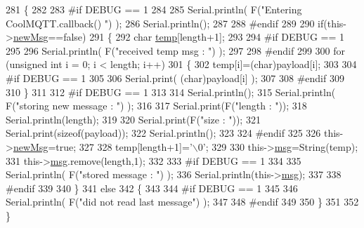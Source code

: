 \begin{DoxyCode}
281 \{
282 
283 \textcolor{preprocessor}{#if DEBUG == 1}
284 
285     Serial.println( F(\textcolor{stringliteral}{"Entering CoolMQTT.callback() "}) );
286     Serial.println();
287 
288 \textcolor{preprocessor}{#endif }
289 
290     \textcolor{keywordflow}{if}(this->\hyperlink{classCoolMQTT_a3240388137b885775aadf38e96b24c6b}{newMsg}==\textcolor{keyword}{false})
291     \{
292         \textcolor{keywordtype}{char} \hyperlink{Irene3000_8h_a5905d48604152cf57aa6bfa087b49173}{temp}[length+1];
293 
294 \textcolor{preprocessor}{    #if DEBUG == 1}
295 
296         Serial.println( F(\textcolor{stringliteral}{"received temp msg : "}) );
297         
298 \textcolor{preprocessor}{    #endif}
299         
300         \textcolor{keywordflow}{for} (\textcolor{keywordtype}{unsigned} \textcolor{keywordtype}{int} i = 0; i < length; i++) 
301         \{
302             temp[i]=(char)payload[i];
303         
304 \textcolor{preprocessor}{        #if DEBUG == 1 }
305 
306             Serial.print( (\textcolor{keywordtype}{char})payload[i] );
307         
308 \textcolor{preprocessor}{        #endif}
309 
310         \}
311     
312 \textcolor{preprocessor}{    #if DEBUG == 1 }
313 
314         Serial.println();
315         Serial.println( F(\textcolor{stringliteral}{"storing new message : "}) );
316 
317         Serial.print(F(\textcolor{stringliteral}{"length : "}));
318         Serial.println(length);
319         
320         Serial.print(F(\textcolor{stringliteral}{"size : "}));
321         Serial.print(\textcolor{keyword}{sizeof}(payload));
322         Serial.println();
323     
324 \textcolor{preprocessor}{    #endif}
325 
326         this->\hyperlink{classCoolMQTT_a3240388137b885775aadf38e96b24c6b}{newMsg}=\textcolor{keyword}{true};
327 
328         temp[length+1]=\textcolor{charliteral}{'\(\backslash\)0'};
329 
330         this->\hyperlink{classCoolMQTT_af6b19e7074dbbb4ae493c44dcb53f7ff}{msg}=String(temp);
331         this->\hyperlink{classCoolMQTT_af6b19e7074dbbb4ae493c44dcb53f7ff}{msg}.remove(length,1);
332     
333 \textcolor{preprocessor}{    #if DEBUG == 1 }
334 
335         Serial.println( F(\textcolor{stringliteral}{"stored message : "}) );
336         Serial.println(this->\hyperlink{classCoolMQTT_af6b19e7074dbbb4ae493c44dcb53f7ff}{msg});
337     
338 \textcolor{preprocessor}{    #endif}
339 
340     \}
341     \textcolor{keywordflow}{else}
342     \{
343     
344 \textcolor{preprocessor}{    #if DEBUG == 1}
345 
346         Serial.println( F(\textcolor{stringliteral}{"did not read last message"}) );
347     
348 \textcolor{preprocessor}{    #endif }
349         
350     \}
351 
352 \}
\end{DoxyCode}
